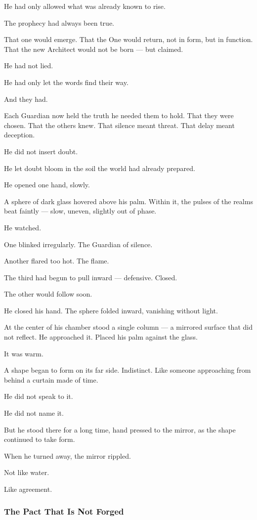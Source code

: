 \documentclass[12pt]{article}
\begin{document}
He had only allowed what was already known to rise.

The prophecy had always been true.

That one would emerge. That the One would return, not in form, but in function. That the new Architect would not be born — but claimed.

He had not lied.

He had only let the words find their way.

And they had.

Each Guardian now held the truth he needed them to hold. That they were chosen. That the others knew. That silence meant threat. That delay meant deception.

He did not insert doubt.

He let doubt bloom in the soil the world had already prepared.

He opened one hand, slowly.

A sphere of dark glass hovered above his palm. Within it, the pulses of the realms beat faintly — slow, uneven, slightly out of phase.

He watched.

One blinked irregularly. The Guardian of silence.

Another flared too hot. The flame.

The third had begun to pull inward — defensive. Closed.

The other would follow soon.

He closed his hand. The sphere folded inward, vanishing without light.

At the center of his chamber stood a single column — a mirrored surface that did not reflect. He approached it. Placed his palm against the glass.

It was warm.

A shape began to form on its far side. Indistinct. Like someone approaching from behind a curtain made of time.

He did not speak to it.

He did not name it.

But he stood there for a long time, hand pressed to the mirror, as the shape continued to take form.

When he turned away, the mirror rippled.

Not like water.

Like agreement.

\dotfill

\subsubsection{The Pact That Is Not Forged}
\end{document}
